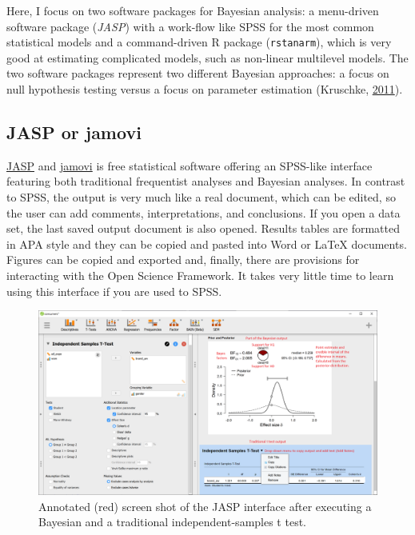 \documentclass[
  english,
  doc]{apa6}
\begin{document}
Here, I focus on two software packages for Bayesian analysis: a menu-driven software package (\emph{JASP}) with a work-flow like SPSS for the most common statistical models and a command-driven R package (\texttt{rstanarm}), which is very good at estimating complicated models, such as non-linear multilevel models. The two software packages represent two different Bayesian approaches: a focus on null hypothesis testing versus a focus on parameter estimation (Kruschke, \protect\hyperlink{ref-kruschkeBayesianAssessmentNull2011}{2011}).

\hypertarget{jasp-or-jamovi}{%
\subsection{JASP or jamovi}\label{jasp-or-jamovi}}

\href{https://jasp-stats.org/}{JASP} and \href{https://www.jamovi.org/}{jamovi} is free statistical software offering an SPSS-like interface featuring both traditional frequentist analyses and Bayesian analyses. In contrast to SPSS, the output is very much like a real document, which can be edited, so the user can add comments, interpretations, and conclusions. If you open a data set, the last saved output document is also opened. Results tables are formatted in APA style and they can be copied and pasted into Word or LaTeX documents. Figures can be copied and exported and, finally, there are provisions for interacting with the Open Science Framework. It takes very little time to learn using this interface if you are used to SPSS.

\begin{figure}[H]
\includegraphics[width=1\linewidth]{JASP} \caption{Annotated (red) screen shot of the JASP interface after executing a Bayesian and a traditional independent-samples t test.}\label{fig:JASPscreenshot}
\end{figure}
\end{document}
